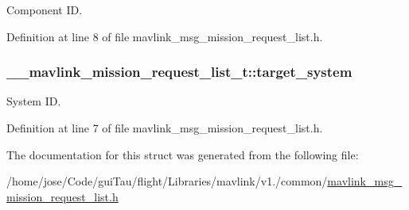 Component I\-D. 



Definition at line 8 of file mavlink\-\_\-msg\-\_\-mission\-\_\-request\-\_\-list.\-h.

\hypertarget{struct____mavlink__mission__request__list__t_ae8b0c8bffa1ecde59f37cdf8b65f47d4}{
\subsubsection[{target\-\_\-system}]{ \-\_\-\-\_\-mavlink\-\_\-mission\-\_\-request\-\_\-list\-\_\-t\-::target\-\_\-system}}\label{struct____mavlink__mission__request__list__t_ae8b0c8bffa1ecde59f37cdf8b65f47d4}


System I\-D. 



Definition at line 7 of file mavlink\-\_\-msg\-\_\-mission\-\_\-request\-\_\-list.\-h.



The documentation for this struct was generated from the following file\-:\begin{DoxyCompactItemize}
\item 
/home/jose/\-Code/gui\-Tau/flight/\-Libraries/mavlink/v1./common/\hyperlink{mavlink__msg__mission__request__list_8h}{mavlink\-\_\-msg\-\_\-mission\-\_\-request\-\_\-list.\-h}\end{DoxyCompactItemize}
